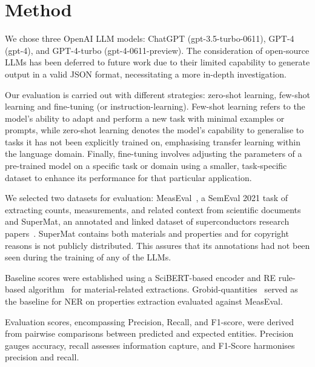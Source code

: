 \documentclass[a4paper]{article}
\begin{document}


\section{Method}
\label{sec:method}
We chose three OpenAI LLM models: ChatGPT (gpt-3.5-turbo-0611), GPT-4 (gpt-4), and GPT-4-turbo (gpt-4-0611-preview). The consideration of open-source LLMs has been deferred to future work due to their limited capability to generate output in a valid JSON format, necessitating a more in-depth investigation.

Our evaluation is carried out with different strategies: zero-shot learning, few-shot learning and fine-tuning (or instruction-learning).  
Few-shot learning refers to the model's ability to adapt and perform a new task with minimal examples or prompts, while zero-shot learning denotes the model's capability to generalise to tasks it has not been explicitly trained on, emphasising transfer learning within the language domain.
Finally, fine-tuning involves adjusting the parameters of a pre-trained model on a specific task or domain using a smaller, task-specific dataset to enhance its performance for that particular application.

We selected two datasets for evaluation: MeasEval~\cite{harper2021semeval2021}, a SemEval 2021 task of extracting counts, measurements, and related context from scientific documents and SuperMat, an annotated and linked dataset of superconductors research papers~\cite{lfoppiano2021supermat}. 
SuperMat contains both materials and properties and for copyright reasons is not publicly distributed. 
This assures that its annotations had not been seen during the training of any of the LLMs.

Baseline scores were established using a SciBERT-based encoder and RE rule-based algorithm~\cite{lfoppiano2023automatic} for material-related extractions. Grobid-quantities~\cite{foppiano2019quantities} served as the baseline for NER on properties extraction evaluated against MeasEval.

Evaluation scores, encompassing Precision, Recall, and F1-score, were derived from pairwise comparisons between predicted and expected entities. Precision gauges accuracy, recall assesses information capture, and F1-Score harmonises precision and recall.
\end{document}
